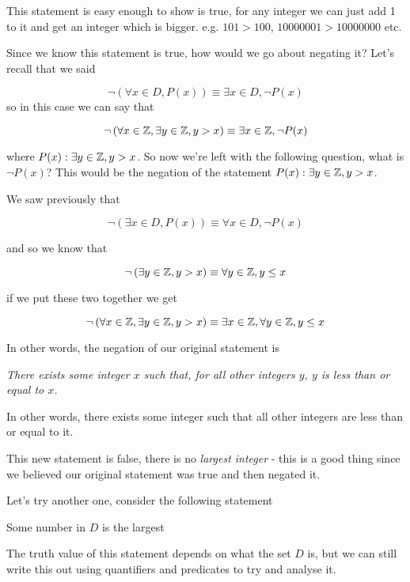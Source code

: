 This statement is easy enough to show is true, for any integer we can just add 1 to it and get an integer which is bigger. e.g. $101 > 100$, $10000001 > 10000000$ etc.

Since we know this statement is true, how would we go about negating it? Let's recall that we said

$$\lnot \left(\forall x \in D, P(x)\right) \equiv \exists x \in D, \lnot P(x)$$
so in this case we can say that

$$\lnot \left(\forall x \in \mathbb{Z}, \exists y \in \mathbb{Z} , y > x\right) \equiv \exists x \in \mathbb{Z}, \lnot P(x)$$

where $P(x): \exists y \in \mathbb{Z} , y > x$. So now we're left with the following question, what is $\lnot P(x)$? This would be the negation of the statement $P(x): \exists y \in \mathbb{Z} , y > x$.

\newpage
We saw previously that

$$\lnot \left(\exists x \in D, P(x)\right) \equiv \forall x \in D, \lnot P(x)$$

and so we know that

$$\lnot \left(\exists y \in \mathbb{Z} , y > x\right) \equiv \forall y \in \mathbb{Z}, y \leq x$$

if we put these two together we get

$$\lnot \left(\forall x \in \mathbb{Z}, \exists y \in \mathbb{Z} , y > x\right) \equiv \exists x \in \mathbb{Z}, \forall y \in \mathbb{Z}, y \leq x$$

In other words, the negation of our original statement is
\begin{center}
    \emph{There exists some integer $x$ such that, for all other integers $y$, $y$ is less than or equal to $x$.}
\end{center}
In other words, there exists some integer such that all other integers are less than or equal to it.

This new statement is false, there is no \emph{largest integer} - this is a good thing since we believed our original statement was true and then negated it.

Let's try another one, consider the following statement
\begin{center}
    Some number in $D$ is the largest
\end{center}

The truth value of this statement depends on what the set $D$ is, but we can still write this out using quantifiers and predicates to try and analyse it.

